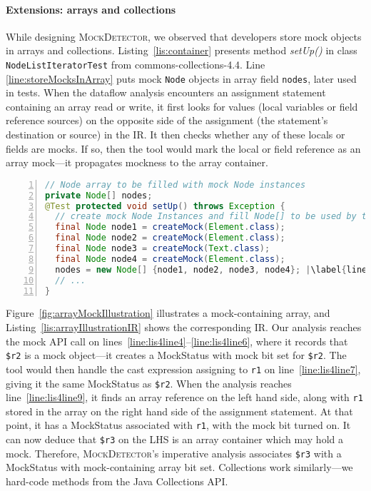 \paragraph{Extensions: arrays and collections} While designing \textsc{MockDetector}, we observed that developers store mock objects in arrays and collections. Listing~\ref{lis:container} presents method \textit{setUp()} in class \texttt{NodeListIteratorTest} from commons-collections-4.4. Line \ref{line:storeMocksInArray} puts mock \texttt{Node} objects in array field \texttt{nodes}, later used in tests. When the dataflow analysis encounters an assignment statement containing an array read or write, it first looks for values (local variables or field reference sources) on the opposite side of the assignment (the statement's destination or source) in the IR. It then checks whether any of these locals or fields are mocks. If so, then the tool would mark the local or field reference as an array mock---it propagates mockness to the array container.

\begin{lstlisting}[basicstyle=\ttfamily, caption={This example illustrates a field array container holding mock objects from \textit{setUp()} in \texttt{NodeListIteratorTest}.},
numbers=left,numbersep=2pt,basicstyle=\scriptsize\ttfamily,language = Java, framesep=4.5mm, framexleftmargin=1.0mm, captionpos=b, label=lis:container, escapechar=|, morekeywords={@Test}]
// Node array to be filled with mock Node instances
private Node[] nodes;
@Test protected void setUp() throws Exception {
  // create mock Node Instances and fill Node[] to be used by tests
  final Node node1 = createMock(Element.class);
  final Node node2 = createMock(Element.class);
  final Node node3 = createMock(Text.class);
  final Node node4 = createMock(Element.class);
  nodes = new Node[] {node1, node2, node3, node4}; |\label{line:storeMocksInArray}|
  // ...
}
\end{lstlisting}

Figure~\ref{fig:arrayMockIllustration} illustrates a mock-containing array, and Listing~\ref{lis:arrayIllustrationIR} shows the corresponding IR. Our analysis reaches the mock API call on lines~\ref{line:lis4line4}--\ref{line:lis4line6}, where it records that \texttt{\$r2} is a mock object---it creates a MockStatus with mock bit set for \texttt{\$r2}. The tool would then handle the cast expression assigning to \texttt{r1} on line~\ref{line:lis4line7}, giving it the same MockStatus as \texttt{\$r2}. When the analysis reaches line~\ref{line:lis4line9}, it finds an array reference on the left hand side, along with \texttt{r1} stored in the array on the right hand side of the assignment statement. At that point, it has a MockStatus associated with \texttt{r1}, with the mock bit turned on. It can now deduce that \texttt{\$r3} on the LHS is an array container which may hold a mock. Therefore, \textsc{MockDetector}'s imperative analysis associates \texttt{\$r3} with a MockStatus with mock-containing array bit set. Collections work similarly---we hard-code methods from the Java Collections API.

